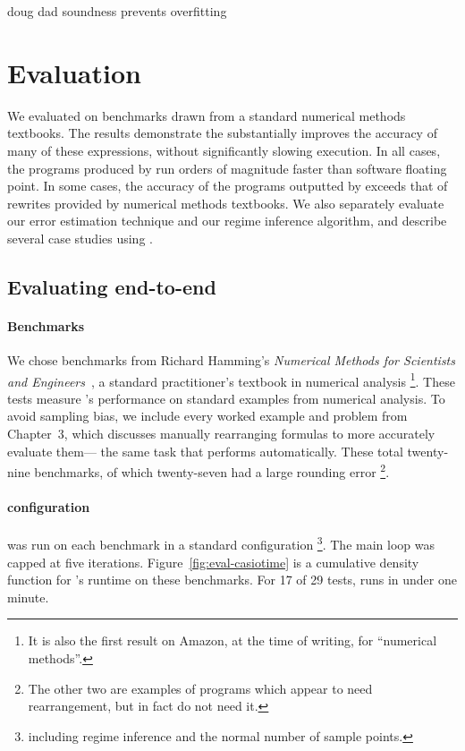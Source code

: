 \documentclass[paper.tex]{subfiles}
\begin{document}
doug dad soundness prevents overfitting

\section{Evaluation}
\label{sec:evaluation}


We evaluated \casio on benchmarks drawn from
  a standard numerical methods textbooks.
The results demonstrate the \casio substantially improves
  the accuracy of many of these expressions,
  without significantly slowing execution.
In all cases, the programs produced by \casio run
  orders of magnitude faster than software floating point.
In some cases, the accuracy of the programs outputted by \casio 
  exceeds that of rewrites provided by numerical methods textbooks.
We also separately evaluate our error estimation technique
  and our regime inference algorithm,
  and describe several case studies using \casio.

\subsection{Evaluating \casio end-to-end}

\paragraph{Benchmarks}
We chose benchmarks from Richard Hamming's
  \emph{Numerical Methods for Scientists and Engineers}~\cite{book87-nmse},
  a standard practitioner's textbook in numerical analysis%
  \footnote{It is also the first result on Amazon, at the time of writing, for ``numerical methods''.}.
These tests measure \casio's performance on standard examples
  from numerical analysis.
To avoid sampling bias, we include every worked example and problem from Chapter~3,
  which discusses manually rearranging formulas to more accurately evaluate them---%
  the same task that \casio performs automatically.
These total twenty-nine benchmarks,
  of which twenty-seven had a large rounding error%
  \footnote{The other two are examples of programs
  which appear to need rearrangement, but in fact do not need it.}.

\paragraph{\casio configuration}
\casio was run on each benchmark in a standard configuration%
  \footnote{including regime inference and
    the normal number of sample points.}.
The main loop was capped at five iterations.
Figure~\ref{fig:eval-casiotime} is a cumulative density function
  for \casio's runtime on these benchmarks.
For 17 of 29 tests, \casio runs in under one minute.
\end{document}
